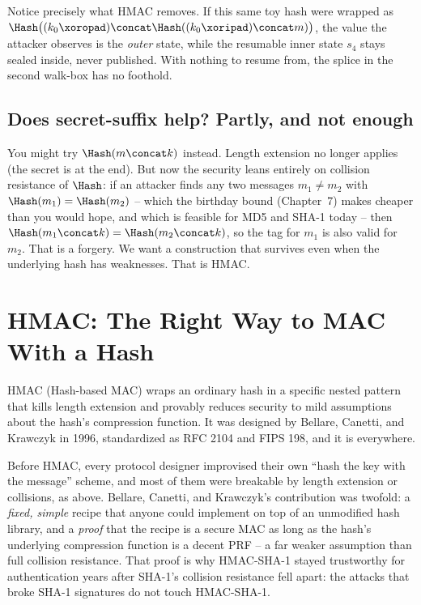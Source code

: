 Notice precisely what HMAC removes. If this same toy hash were wrapped as $\Hash\big((k_0\xor\texttt{opad})\concat \Hash((k_0\xor\texttt{ipad})\concat m)\big)$, the value the attacker observes is the \emph{outer} state, while the resumable inner state $s_4$ stays sealed inside, never published. With nothing to resume from, the splice in the second walk-box has no foothold.

\subsection{Does secret-suffix help? Partly, and not enough}

You might try $\Hash(m\concat k)$ instead. Length extension no longer applies (the secret is at the end). But now the security leans entirely on collision resistance of $\Hash$: if an attacker finds any two messages $m_1\ne m_2$ with $\Hash(m_1)=\Hash(m_2)$ -- which the birthday bound (Chapter~7) makes cheaper than you would hope, and which is feasible for MD5 and SHA-1 today -- then $\Hash(m_1\concat k)=\Hash(m_2\concat k)$, so the tag for $m_1$ is also valid for $m_2$. That is a forgery. We want a construction that survives even when the underlying hash has weaknesses. That is HMAC.

\section{HMAC: The Right Way to MAC With a Hash}
\label{ch15:hmac}

HMAC (Hash-based MAC) wraps an ordinary hash in a specific nested pattern that kills length extension and provably reduces security to mild assumptions about the hash's compression function. It was designed by Bellare, Canetti, and Krawczyk in 1996, standardized as RFC 2104 and FIPS 198, and it is everywhere.

\begin{historybox}
Before HMAC, every protocol designer improvised their own ``hash the key with the message'' scheme, and most of them were breakable by length extension or collisions, as above. Bellare, Canetti, and Krawczyk's contribution was twofold: a \emph{fixed, simple} recipe that anyone could implement on top of an unmodified hash library, and a \emph{proof} that the recipe is a secure MAC as long as the hash's underlying compression function is a decent PRF -- a far weaker assumption than full collision resistance. That proof is why HMAC-SHA-1 stayed trustworthy for authentication years after SHA-1's collision resistance fell apart: the attacks that broke SHA-1 signatures do not touch HMAC-SHA-1.
\end{historybox}

